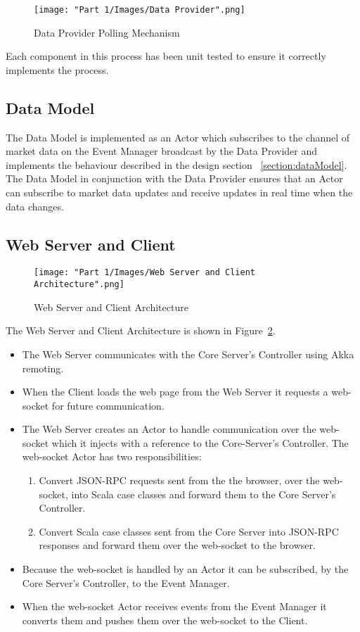 		\begin{figure}[H]
			\centering		
			\texttt{[image: "Part 1/Images/Data Provider".png]}
			\caption{Data Provider Polling Mechanism}
			\label{fig:dataProvider}
		\end{figure}
	
	Each component in this process has been unit tested to ensure it correctly implements the process.	
	
	\subsection{Data Model}
	The Data Model is implemented as an Actor which subscribes to the channel of market data on the Event Manager broadcast by the Data Provider and implements the behaviour described in the design section ~\ref{section:dataModel}.\\
	
	The Data Model in conjunction with the Data Provider ensures that an Actor can subscribe to market data updates and receive updates in real time when the data changes.

	\subsection{Web Server and Client}		
		\begin{figure}[H]
			\centering
			\texttt{[image: "Part 1/Images/Web Server and Client Architecture".png]}
			\caption{Web Server and Client Architecture}
    			\label{fig:webServerAndClientArchitecture}
		\end{figure}	

	The Web Server and Client Architecture is shown in Figure~\ref{fig:webServerAndClientArchitecture}.
	\begin{itemize}
		\item The Web Server communicates with the Core Server’s Controller using Akka remoting\cite{AkkaRemoting}.
		\item When the Client loads the web page from the Web Server it requests a web-socket for future communication.
		\item The Web Server creates an Actor to handle communication over the web-socket which it injects with a reference to the Core-Server's Controller.  The web-socket Actor has two responsibilities:
			\begin{enumerate}
				\item Convert JSON-RPC requests sent from the the browser, over the web-socket, into Scala case classes and forward them to the Core Server’s Controller.
				\item Convert Scala case classes sent from the Core Server into JSON-RPC responses and forward them over the web-socket to the browser.
			\end{enumerate}
		\item Because the web-socket is handled by an Actor it can be subscribed, by the Core Server's Controller, to the Event Manager.
		\item When the web-socket Actor receives events from the Event Manager it converts them and pushes them over the web-socket to the Client.
	\end{itemize}		
	
